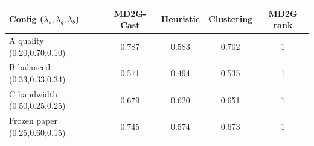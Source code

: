 \begin{tabular}{lcccc}
\hline
Config ($\lambda_o,\lambda_q,\lambda_b$) & MD2G-Cast & Heuristic & Clustering & MD2G rank \\
\hline
A quality (0.20,0.70,0.10) & 0.787 & 0.583 & 0.702 & 1 \\
B balanced (0.33,0.33,0.34) & 0.571 & 0.494 & 0.535 & 1 \\
C bandwidth (0.50,0.25,0.25) & 0.679 & 0.620 & 0.651 & 1 \\
Frozen paper (0.25,0.60,0.15) & 0.745 & 0.574 & 0.673 & 1 \\
\hline
\end{tabular}
